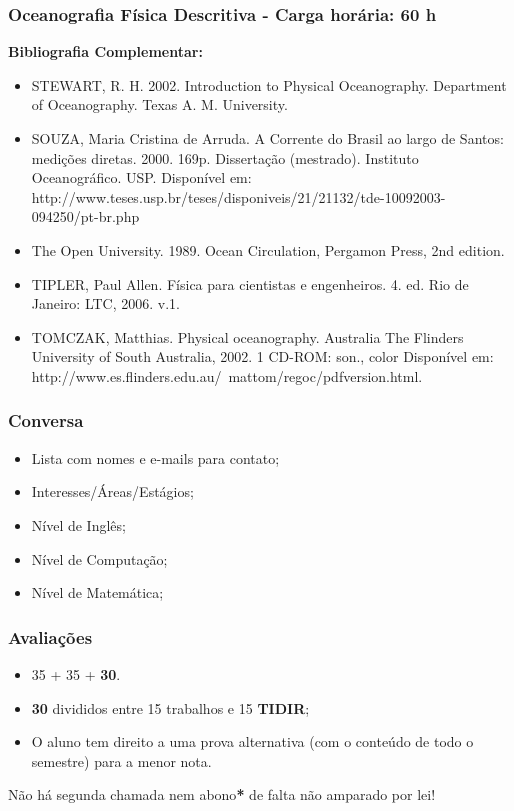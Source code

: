 \begin{frame}
    \frametitle{Oceanografia Física Descritiva - Carga horária: 60 h}
    {\scriptsize
    {\bf Bibliografia Complementar:}
    \begin{itemize}[<+-| alert@+>]
        \item STEWART, R. H. 2002. Introduction to Physical Oceanography.
              Department of Oceanography. Texas A. M. University.
        \item SOUZA, Maria Cristina de Arruda. A Corrente do Brasil ao largo de
              Santos: medições diretas. 2000. 169p. Dissertação  (mestrado).
              Instituto Oceanográfico. USP. Disponível  em:
              http://www.teses.usp.br/teses/disponiveis/21/21132/tde-10092003-094250/pt-br.php
        \item The Open University. 1989. Ocean Circulation, Pergamon Press,
              2nd edition.
        \item TIPLER, Paul Allen. Física para cientistas e engenheiros. 4.
              ed. Rio de Janeiro: LTC, 2006. v.1.
        \item TOMCZAK, Matthias. Physical oceanography. Australia The
              Flinders University of South Australia, 2002. 1 CD-ROM:
              son., color Disponível em:
              http://www.es.flinders.edu.au/~mattom/regoc/pdfversion.html.
    \end{itemize}
    }
\end{frame}

\begin{frame}
    \frametitle{Conversa}
    \begin{itemize}
        \item Lista com nomes e e-mails para contato;
        \item Interesses/Áreas/Estágios;
        \item Nível de Inglês;
        \item Nível de Computação;
        \item Nível de Matemática;
    \end{itemize}
\end{frame}

\begin{frame}
    \frametitle{Avaliações}
    \begin{itemize}[<+-| alert@+>]
        \item 35 + 35 + {\bf 30}.
        \item {\bf 30} divididos entre 15 trabalhos e 15 {\bf TIDIR};
        \item O aluno tem direito a uma prova alternativa (com o conteúdo de
              todo o semestre) para a menor nota.
    \end{itemize}
    \pause
    \begin{block}{}
        Não há segunda chamada{\bf *} nem abono{\bf **}
        de falta não amparado por lei!
    \end{block}
    \pause
\end{frame}

